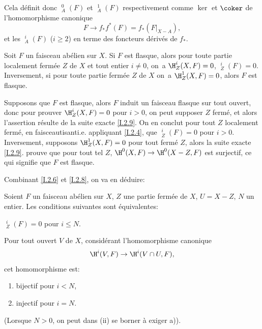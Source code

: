 Cela d\'efinit donc $\mathop{\underline{\mathrm{H}}}\nolimits^0_A(F)$ et $\mathop{\underline{\mathrm{H}}}\nolimits_A^1(F)$ respectivement comme $\ker$ et $\coker$ de l'homomorphisme canonique
$$F \to f_*f^*(F)= f_*(F|_{X-A}),
$$
et les $\mathop{\underline{\mathrm{H}}}\nolimits_A^i(F)$ ($i\geq 2$) en terme des foncteurs d\'eriv\'es de $f_*$.

\begin{corollaire} \label{I.2.12}
Soit $F$ un faisceau ab\'elien sur $X$. Si $F$ est flasque, alors pour toute partie localement ferm\'ee $Z$ de $X$ et tout entier $i\neq 0$, on~a $\H^i_Z(X, F)=0$, $\mathop{\underline{\mathrm{H}}}\nolimits^i_Z(F)=0$. Inversement, si pour toute partie ferm\'ee $Z$ de $X$ on~a $\H_Z^1(X, F)=0$, alors $F$ est flasque.
\end{corollaire}

Supposons que $F$ est flasque, alors $F$ induit un faisceau flasque sur tout ouvert, donc pour prouver $\H^i_Z(X, F)=0$ pour $i>0$, on peut supposer $Z$ ferm\'e, et alors l'assertion r\'esulte de la suite exacte \ref{I.2.9}. On en conclut pour tout $Z$ localement ferm\'e, en \og faisceautisant\fg i.e. appliquant \ref{I.2.4}, que $\mathop{\underline{\mathrm{H}}}\nolimits^i_Z(F)=0$ pour $i>0$. Inversement, supposons $\H^1_Z(X, F)=0$ pour tout ferm\'e $Z$, alors la suite exacte \ref{I.2.9}. prouve que pour tout tel $Z$, $\H^0(X, F) \to \H^0(X-Z, F)$ est surjectif, ce qui signifie que $F$ est flasque.

Combinant \ref{I.2.6} et \ref{I.2.8}, on va en d\'eduire:

\begin{proposition} \label{I.2.13}
Soient $F$ un faisceau ab\'elien sur $X$, $Z$ une partie ferm\'ee de $X$, $U=X-Z$, $N$ un entier. Les conditions suivantes sont \'equivalentes:
\begin{enumeratei}
\item
$\mathop{\underline{\mathrm{H}}}\nolimits^i_Z(F)=0$ pour $i\leq N$.
\item
Pour tout ouvert $V$ de $X$, consid\'erant l'homomorphisme canonique
$$
\H^i(V, F) \to \H^i(V\cap U, F),$$
cet homomorphisme est:
\begin{enumerate}
\item[\textup{a)}] bijectif pour $i<N$,
\item[\textup{b)}] injectif pour $i=N$.
\end{enumerate}
\end{enumeratei}
\noindent
(Lorsque $N>0$, on peut dans \textup{(ii)} se borner \`a exiger \textup{a)}).
\end{proposition}

